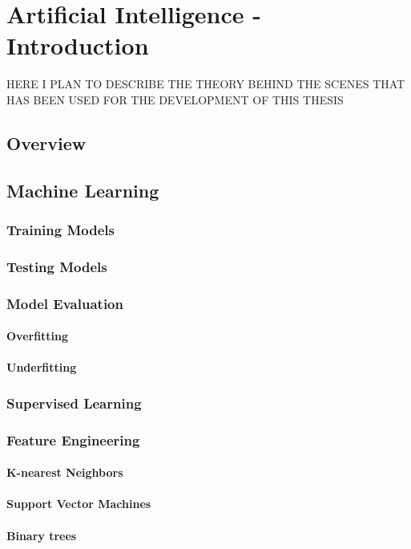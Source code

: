 \acresetall
\chapter{Artificial Intelligence - Introduction}\label{chapter:ml_intro}

HERE I PLAN TO DESCRIBE THE THEORY BEHIND THE SCENES THAT HAS BEEN USED FOR THE DEVELOPMENT OF THIS THESIS

\section{Overview}

\section{Machine Learning}
\subsection{Training Models}
\subsection{Testing Models}
\subsection{Model Evaluation}
\subsubsection{Overfitting}
\subsubsection{Underfitting}
\subsection{Supervised Learning}
\subsection{Feature Engineering}
\subsubsection{K-nearest Neighbors}
\subsubsection{Support Vector Machines}
\subsubsection{Binary trees}
